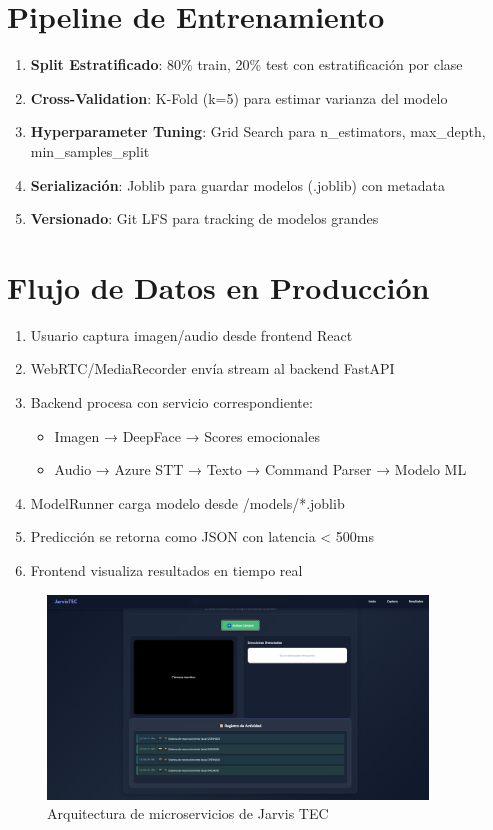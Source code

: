 \section{Pipeline de Entrenamiento}

\begin{enumerate}
    \item \textbf{Split Estratificado}: 80\% train, 20\% test con estratificación por clase
    \item \textbf{Cross-Validation}: K-Fold (k=5) para estimar varianza del modelo
    \item \textbf{Hyperparameter Tuning}: Grid Search para n\_estimators, max\_depth, min\_samples\_split
    \item \textbf{Serialización}: Joblib para guardar modelos (.joblib) con metadata
    \item \textbf{Versionado}: Git LFS para tracking de modelos grandes
\end{enumerate}

\section{Flujo de Datos en Producción}

\begin{enumerate}
    \item Usuario captura imagen/audio desde frontend React
    \item WebRTC/MediaRecorder envía stream al backend FastAPI
    \item Backend procesa con servicio correspondiente:
        \begin{itemize}
            \item Imagen → DeepFace → Scores emocionales
            \item Audio → Azure STT → Texto → Command Parser → Modelo ML
        \end{itemize}
    \item ModelRunner carga modelo desde /models/*.joblib
    \item Predicción se retorna como JSON con latencia < 500ms
    \item Frontend visualiza resultados en tiempo real
\end{enumerate}

\begin{figure}[h]
    \centering
   \includegraphics[width=0.9\textwidth]{IMAGES/anexo1.PNG}
    \caption{Arquitectura de microservicios de Jarvis TEC}
   \label{fig:architecture}
\end{figure}
